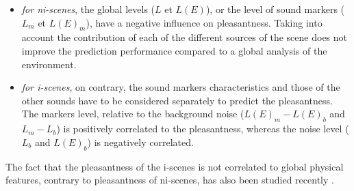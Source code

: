 \documentclass[12pt]{elsarticle}
\newcommand{\cf}{cf.}
\begin{document}
\begin{itemize}
\begin{itemize}
\item \emph{for ni-scenes}, the global levels ($L$ et $L(E)$), or the level of sound markers ($L_m$ et $L(E)_{m}$), have a negative influence on pleasantness. Taking into account the contribution of each of the different sources of the scene does not improve the prediction performance compared to a global analysis of the environment.


\item \emph{for i-scenes}, on contrary, the sound markers characteristics and those of the other sounds have to be considered separately to predict  the pleasantness. The markers level, relative to the background noise ($L(E)_m-L(E)_b$ and $L_m-L_b$) is positively correlated to the pleasantness, whereas the noise level ($L_b$ and $L(E)_b$) is negatively correlated.

\end{itemize}
\end{itemize}


The fact that the pleasantness of the i-scenes is not correlated to global physical features, contrary to pleasantness of ni-scenes, has also been studied recently \cite{gozalo2015relationship}.

\end{document}
